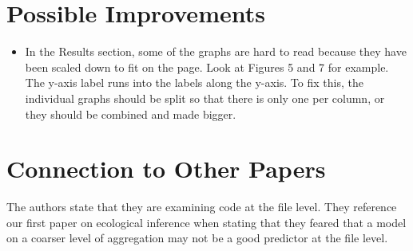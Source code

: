 \documentclass[english]{article}
\begin{document}
\section*{Possible Improvements}
\begin{itemize}
\item In the Results section, some of the graphs are hard to read because they have been scaled down to fit on the page. Look at Figures 5 and 7 for example. The y-axis label runs into the labels along the y-axis. To fix this, the individual graphs should be split so that there is only one per column, or they should be combined and made bigger.
\end{itemize}

\section*{Connection to Other Papers}
The authors state that they are examining code at the file level. They reference our first paper on ecological inference \cite{Posnett} when stating that they feared that a model on a coarser level of aggregation may not be a good predictor at the file level. 



\end{document}
